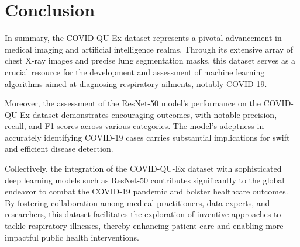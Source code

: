 \documentclass{article}
\begin{document}
\newpage
\section{Conclusion}
In summary, the COVID-QU-Ex dataset represents a pivotal advancement in medical imaging and artificial intelligence realms. Through its extensive array of chest X-ray images and precise lung segmentation masks, this dataset serves as a crucial resource for the development and assessment of machine learning algorithms aimed at diagnosing respiratory ailments, notably COVID-19.

Moreover, the assessment of the ResNet-50 model's performance on the COVID-QU-Ex dataset demonstrates encouraging outcomes, with notable precision, recall, and F1-scores across various categories. The model's adeptness in accurately identifying COVID-19 cases carries substantial implications for swift and efficient disease detection.

Collectively, the integration of the COVID-QU-Ex dataset with sophisticated deep learning models such as ResNet-50 contributes significantly to the global endeavor to combat the COVID-19 pandemic and bolster healthcare outcomes. By fostering collaboration among medical practitioners, data experts, and researchers, this dataset facilitates the exploration of inventive approaches to tackle respiratory illnesses, thereby enhancing patient care and enabling more impactful public health interventions.
\end{document}
